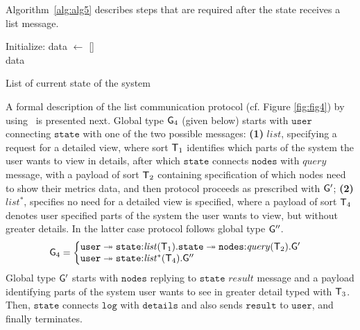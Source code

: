 \noindent
Algorithm~\ref{alg:alg5} describes steps that are required after the state receives a list message.

\begin{algorithm}[H]
	\SetAlgoLined
	Initialize: data $\leftarrow$ []\\
	\Return data
	\caption{List of current state of the system}
	\label{alg:alg5}
\end{algorithm}

\noindent
A formal description of the list communication protocol (cf. Figure \ref{fig:fig4}) by using~\cite{HuY17} is presented next. Global type ${\sf G}_4$ (given below) starts with $\mathtt{user}$ connecting $\mathtt{state}$ with one of the two possible messages: 
\textbf{(1)} $\mathit{list}$, specifying a request for a detailed view, where sort ${\mathsf T}_1$ identifies which parts of the system the user wants to view in details, after which $\mathtt{state}$ connects $\mathtt{nodes}$ with $\mathit{query}$ message, with a payload of sort ${\mathsf T}_2$  containing specification of which nodes need to show their metrics data, and then protocol proceeds as prescribed with ${\sf G}'$; 
\textbf{(2)} $\mathit{list^*}$, specifies no need for a detailed view is specified, where a payload of sort ${\mathsf T}_4$ denotes user specified parts of the system the user wants to view, but without greater details. In the latter case protocol follows global type ${\sf G}''$.
\begin{align*}
\G_4 &= 
\left\{
\begin{array}{@{}l@{}}  
\mathtt{user} \twoheadrightarrow \mathtt{state}{:}\mathit{list}(\T_1).\mathtt{state}\twoheadrightarrow\mathtt{nodes}{:}\mathit{query}(\T_2). \G' \\
\mathtt{user} \twoheadrightarrow \mathtt{state}{:}\mathit{list^*}(\T_4).\G''
\end{array} \right.
\end{align*}
Global type ${\sf G}'$ starts with $\mathtt{nodes}$ replying to $\mathtt{state}$ $\mathit{result}$ message and a payload identifying parts of the system user wants to see in greater detail typed with ${\mathsf T}_3$. Then, $\mathtt{state}$ connects $\mathtt{log}$ with $\mathtt{details}$ and also sends $\mathtt{result}$ to $\mathtt{user}$, and finally terminates. 
